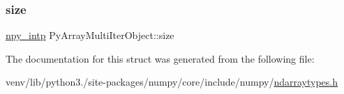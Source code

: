 \mbox{\label{structPyArrayMultiIterObject_a9ad3ab17355bcd13c90fadaab1a21c8b}} 
\subsubsection{\texorpdfstring{size}{size}}
{\footnotesize\ttfamily \hyperlink{npy__common_8h_a2d6effc4d5ecb85675ebfcfaa102b483}{npy\+\_\+intp} Py\+Array\+Multi\+Iter\+Object\+::size}



The documentation for this struct was generated from the following file\+:\begin{DoxyCompactItemize}
\item 
venv/lib/python3./site-\/packages/numpy/core/include/numpy/\hyperlink{ndarraytypes_8h}{ndarraytypes.\+h}\end{DoxyCompactItemize}
